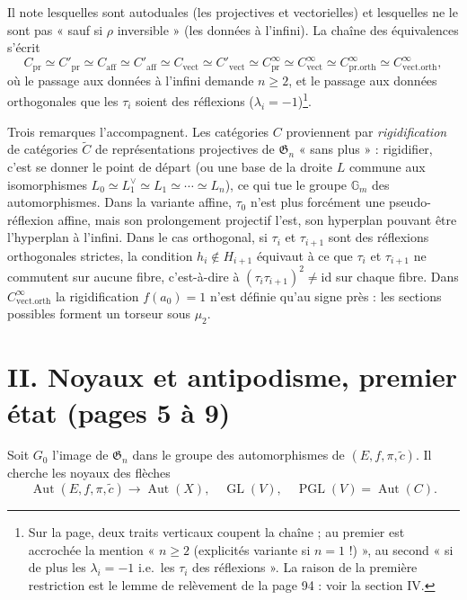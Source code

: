\documentclass[11pt,a4paper]{article}
\begin{document}
Il note lesquelles sont autoduales (les projectives et vectorielles) et
lesquelles ne le sont pas « sauf si $\rho$ inversible » (les données à
l'infini). La chaîne des équivalences s'écrit
\[
C_{\mathrm{pr}} \simeq C'_{\mathrm{pr}} \simeq C_{\mathrm{aff}} \simeq
C'_{\mathrm{aff}} \simeq C_{\mathrm{vect}} \simeq C'_{\mathrm{vect}}
\simeq C^\infty_{\mathrm{pr}} \simeq C^\infty_{\mathrm{vect}}
\simeq C^\infty_{\mathrm{pr.orth}} \simeq C^\infty_{\mathrm{vect.orth}},
\]
où le passage aux données à l'infini demande $n \geqslant 2$, et le passage
aux données orthogonales que les $\tau_i$ soient des réflexions ($\lambda_i
= -1$)\footnote{Sur la page, deux traits verticaux coupent la chaîne ; au
premier est accrochée la mention « $n \geqslant 2$ (explicités variante si $n =
1$ !) », au second « si de plus les $\lambda_i = -1$ i.e.\ les $\tau_i$ des
réflexions ». La raison de la première restriction est le lemme de relèvement
de la page 94 : voir la section IV.}.

Trois remarques l'accompagnent. Les catégories $C$ proviennent par
\emph{rigidification} de catégories $\widetilde{C}$ de représentations
projectives de $\mathfrak{G}_n$ « sans plus » : rigidifier, c'est se donner le
point de départ (ou une base de la droite $L$ commune aux isomorphismes
$L_0 \simeq L_1^\vee \simeq L_1 \simeq \cdots \simeq L_n$), ce qui tue le
groupe $\mathbb{G}_m$ des automorphismes. Dans la variante affine, $\tau_0$
n'est plus forcément une pseudo-réflexion affine, mais son prolongement
projectif l'est, son hyperplan pouvant être l'hyperplan à l'infini. Dans le cas
orthogonal, si $\tau_i$ et $\tau_{i+1}$ sont des réflexions orthogonales
strictes, la condition $h_i \notin H_{i+1}$ équivaut à ce que $\tau_i$ et
$\tau_{i+1}$ ne commutent sur aucune fibre, c'est-à-dire à
$(\tau_i\tau_{i+1})^2 \neq \mathrm{id}$ sur chaque fibre. Dans
$C^\infty_{\mathrm{vect.orth}}$ la rigidification $f(a_0) = 1$ n'est
définie qu'au signe près : les sections possibles forment un torseur sous
$\mu_2$.

\section*{II. Noyaux et antipodisme, premier état (pages 5 à 9)}

Soit $G_0$ l'image de $\mathfrak{G}_n$ dans le groupe des automorphismes de
$(E, f, \pi, \tilde c)$. Il cherche les noyaux des flèches
\[
\operatorname{Aut}(E, f, \pi, \tilde c) \longrightarrow
\operatorname{Aut}(X), \quad \operatorname{GL}(V), \quad
\operatorname{PGL}(V) = \operatorname{Aut}(C).
\]
\end{document}
